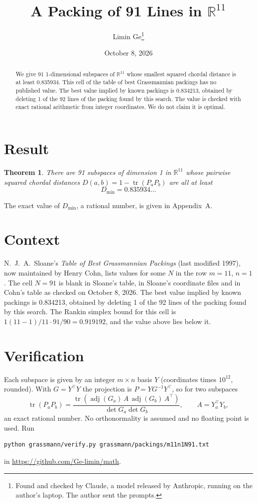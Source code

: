 \documentclass[11pt,a4paper]{article}
\title{A Packing of 91 Lines in $\mathbb{R}^{11}$}
\author{Limin Ge\thanks{Found and checked by Claude, a model released by Anthropic, running on the author's laptop. The author sent the prompts.}}
\date{October 8, 2026}
\newtheorem*{theorem}{Theorem}
\begin{document}
\maketitle
\begin{abstract}
We give 91 1-dimensional subspaces of $\mathbb{R}^{11}$ whose smallest squared chordal distance is at least 0.835934. This cell of the table of best Grassmannian packings has no published value. The best value implied by known packings is 0.834213, obtained by deleting 1 of the 92 lines of the packing found by this search. The value is checked with exact rational arithmetic from integer coordinates. We do not claim it is optimal.
\end{abstract}

\section{Result}
\begin{theorem}
There are 91 subspaces of dimension 1 in $\mathbb{R}^{11}$ whose pairwise squared chordal distances $D(a,b) = 1 - \operatorname{tr}(P_aP_b)$ are all at least
\[ D_{\min} = 0.835934\ldots \]
\end{theorem}
The exact value of $D_{\min}$, a rational number, is given in Appendix~A.


\section{Context}
N.~J.~A.~Sloane's \emph{Table of Best Grassmannian Packings} (last modified 1997), now maintained by Henry Cohn, lists values for some $N$ in the row $m=11$, $n=1$. The cell $N=91$ is blank in Sloane's table, in Sloane's coordinate files and in Cohn's table as checked on October 8, 2026. The best value implied by known packings is 0.834213, obtained by deleting 1 of the 92 lines of the packing found by this search. The Rankin simplex bound for this cell is $1(11-1)/11\cdot 91/90 = 0.919192$, and the value above lies below it.


\section{Verification}
Each subspace is given by an integer $m\times n$ basis $Y$ (coordinates times $10^{12}$, rounded). With $G=Y^\top Y$ the projection is $P=YG^{-1}Y^\top$, so for two subspaces
\[ \operatorname{tr}(P_aP_b)=\frac{\operatorname{tr}(\operatorname{adj}(G_a)\,A\,\operatorname{adj}(G_b)\,A^\top)}{\det G_a\det G_b},\qquad A=Y_a^\top Y_b, \]
an exact rational number. No orthonormality is assumed and no floating point is used. Run
\begin{verbatim}
python grassmann/verify.py grassmann/packings/m11n1N91.txt
\end{verbatim}
in \url{https://github.com/Ge-limin/math}.
\end{document}
